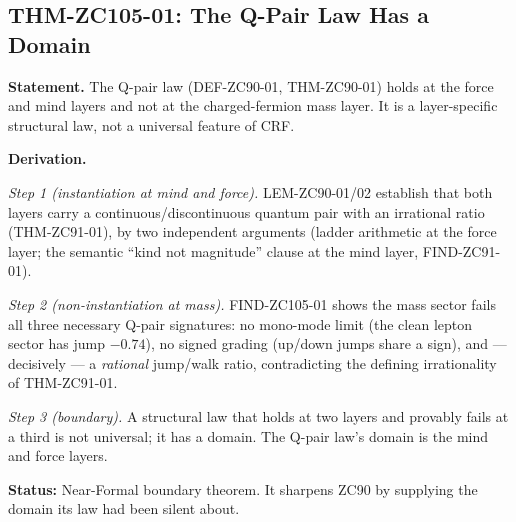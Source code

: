 \documentclass[12pt, a4paper]{article}
\begin{document}
\subsection{THM-ZC105-01: The Q-Pair Law Has a Domain}
\label{sec:thm-zc105}

\begin{formalbox}[title={THM-ZC105-01: The Q-pair law is layer-specific
  ($R_1$, Near-Formal)}]

\textbf{Statement.} The Q-pair law (DEF-ZC90-01, THM-ZC90-01) holds at the force
and mind layers and not at the charged-fermion mass layer. It is a layer-specific
structural law, not a universal feature of CRF.

\textbf{Derivation.}

\textit{Step 1 (instantiation at mind and force).} LEM-ZC90-01/02 establish that
both layers carry a continuous/discontinuous quantum pair with an irrational
ratio (THM-ZC91-01), by two independent arguments (ladder arithmetic at the force
layer; the semantic ``kind not magnitude'' clause at the mind layer,
FIND-ZC91-01).

\textit{Step 2 (non-instantiation at mass).} FIND-ZC105-01 shows the mass sector
fails all three necessary Q-pair signatures: no mono-mode limit (the clean
lepton sector has jump $-0.74$), no signed grading (up/down jumps share a sign),
and --- decisively --- a \emph{rational} jump/walk ratio, contradicting the
defining irrationality of THM-ZC91-01.

\textit{Step 3 (boundary).} A structural law that holds at two layers and
provably fails at a third is not universal; it has a domain. The Q-pair law's
domain is the mind and force layers.

\textbf{Status:} Near-Formal boundary theorem. It sharpens ZC90 by supplying the
domain its law had been silent about.
\end{formalbox}

\end{document}
